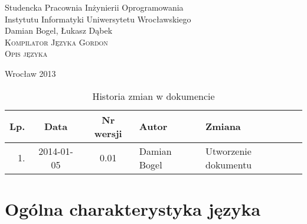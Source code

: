 \documentclass{documentation}
\begin{document}
\begin{titlepage}
\begin{center}
Studencka Pracownia Inżynierii Oprogramowania\\
Instytutu Informatyki Uniwersytetu Wrocławskiego\\[6cm]

Damian Bogel, Łukasz Dąbek\\[1cm]
\textsc{\LARGE Kompilator Języka Gordon}\\[0.5cm]
\textsc{\large Opis języka}

\vfill
Wrocław 2013 \\[2.5cm]

\end{center}
\end{titlepage}

\newpage
\begin{table}
	\centering
    \captionsetup{name=Tabela}
	\caption{Historia zmian w dokumencie}
		\begin{tabular}{|r|c|c|l|l|}
		\hline
		Lp.  & Data       & Nr wersji & Autor                 & Zmiana \\ \hline
		1.   & 2014-01-05 & 0.01 & Damian Bogel & Utworzenie dokumentu \\ \hline
	\end{tabular}
\end{table}
\newpage

\tableofcontents
\setcounter{page}{2}

\newpage

\section{Ogólna charakterystyka języka}
\end{document}
